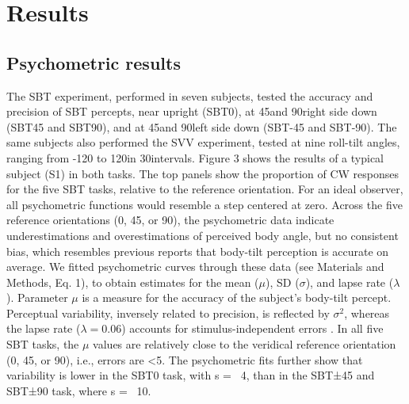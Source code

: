 \section{Results}

\subsection{Psychometric results}
 
The SBT experiment, performed in seven subjects, tested the accuracy and precision of SBT percepts, near upright (SBT0), at 45\textdegree and 90\textdegree right side down (SBT45 and SBT90), and at 45\textdegree and 90\textdegree left side down (SBT-45 and SBT-90). The same subjects also performed the SVV experiment, tested at nine roll-tilt angles, ranging from -120 to 120\textdegree in 30\textdegree intervals. Figure 3 shows the results of a typical subject (S1) in both tasks. The top panels show the proportion of CW responses for the five SBT tasks, relative to the reference orientation. For an ideal observer, all psychometric functions would resemble a step centered at zero. Across the five reference orientations (0\textdegree, {\textpm}45\textdegree, or {\textpm}90\textdegree), the psychometric data indicate underestimations and overestimations of perceived body angle, but no consistent bias, which resembles previous reports \cite{mittelstaedt1983, mast1996, jarchow1999, vanbeuzekom2001} that body-tilt perception is accurate on average. We fitted psychometric curves through these data (see Materials and Methods, Eq. 1), to obtain estimates for the mean ($\mu$), SD ($\sigma$), and lapse rate ($\lambda$). Parameter $\mu$ is a measure for the accuracy of the subject's body-tilt percept. Perceptual variability, inversely related to precision, is reflected by $\sigma^2$, whereas the lapse rate ($\lambda = 0.06$) accounts for stimulus-independent errors \cite{wichmann2001}. In all five SBT tasks, the $\mu$ values are relatively close to the veridical reference orientation (0\textdegree, 45\textdegree, or 90\textdegree), i.e., errors are <5\textdegree. The psychometric fits further show that variability is lower in the SBT0 task, with s = ~4\textdegree, than in the SBT±45 and SBT±90 task, where s = ~10\textdegree. 


